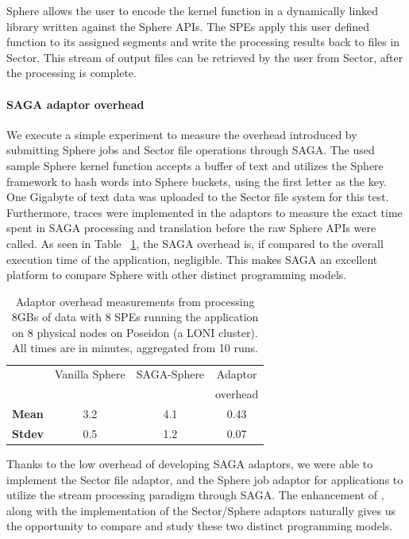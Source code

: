 \documentclass[graybox]{svmult}
\begin{document}
Sphere allows the user to encode the kernel function in a dynamically
linked library written against the Sphere APIs.  The SPEs apply this
user defined function to its assigned segments and write the
processing results back to files in Sector.  This stream of output
files can be retrieved by the user from Sector, after the processing
is complete. 


\paragraph{SAGA adaptor overhead} \label{ssec:overhead}

We execute a simple experiment to measure the overhead introduced by
submitting Sphere jobs and Sector file operations through SAGA.  The
used sample Sphere kernel function accepts a buffer of text and
utilizes the Sphere framework to hash words into Sphere buckets, using
the first letter as the key. One Gigabyte of text data was uploaded to
the Sector file system for this test.  Furthermore, traces were
implemented in the adaptors to measure the exact time spent in SAGA
processing and translation before the raw Sphere APIs were called.  As
seen in Table ~\ref{tab:sphere_overhead}, the SAGA overhead is, if compared
to the overall execution time of the application, negligible.
This makes SAGA an excellent platform to compare Sphere with other distinct
programming models.

\begin{table}
  \footnotesize
  \begin{tabular}{cccc}
    \hline
    & Vanilla Sphere &  SAGA-Sphere & Adaptor \\
    &                &              & overhead \\
    \hline
    { {\bf Mean}} & 3.2    & 4.1    & 0.43  \\
    \hline 
    { {\bf Stdev}} & 0.5    & 1.2    & 0.07   \\
    \hline \hline
  \end{tabular}
  \caption{Adaptor overhead measurements from processing 8GBs of data with 8
  SPEs running the \wc application on 8 physical nodes on Poseidon (a
  LONI cluster).  All times are in minutes, aggregated from 10 runs.
  \label{tab:sphere_overhead}}
\end{table}

Thanks to the low overhead of developing SAGA adaptors, we were able
to implement the Sector file adaptor, and the Sphere job adaptor for
applications to utilize the stream processing paradigm through SAGA.
The enhancement of \sagamapreduce, along with the implementation of the
Sector/Sphere adaptors naturally gives us the opportunity to compare
and study these two distinct programming models.
\end{document}
